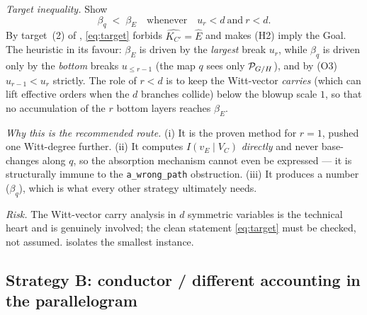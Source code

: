 \documentclass[11pt]{article}
\begin{document}
\noindent\emph{Target inequality.} Show
\begin{equation}\label{eq:target}
\boxed{\ \beta_q \;<\; \beta_E \quad\text{whenever}\quad u_r<d\ \text{and}\ r<d.\ }
\end{equation}
By target~(2) of , \cref{eq:target} forbids
$\widehat{K_{C'}}=\widehat E$ and makes (H2) imply the Goal. The heuristic in
its favour: $\beta_E$ is driven by the \emph{largest} break $u_r$, while
$\beta_q$ is driven only by the \emph{bottom} breaks $u_{\le r-1}$ (the map $q$
sees only $\mathcal{P}_{G/H}$), and by (O3) $u_{r-1}<u_r$ strictly. The role of $r<d$ is
to keep the Witt-vector \emph{carries} (which can lift effective orders when the
$d$ branches collide) below the blowup scale $1$, so that no accumulation of the
$r$ bottom layers reaches $\beta_E$.

\smallskip
\noindent\emph{Why this is the recommended route.} (i) It is the proven method
for $r=1$, pushed one Witt-degree further. (ii) It computes
$I(v_E\mid V_C)$ \emph{directly} and never base-changes along $q$, so the
absorption mechanism cannot even be expressed --- it is structurally immune to
the \texttt{a\_wrong\_path} obstruction. (iii) It produces a number ($\beta_q$),
which is what every other strategy ultimately needs.

\smallskip
\noindent\emph{Risk.} The Witt-vector carry analysis in $d$ symmetric variables
is the technical heart and is genuinely involved; the clean statement
\cref{eq:target} must be checked, not assumed.  isolates the
smallest instance.

\subsection*{Strategy B: conductor / different accounting in the parallelogram}
\end{document}

